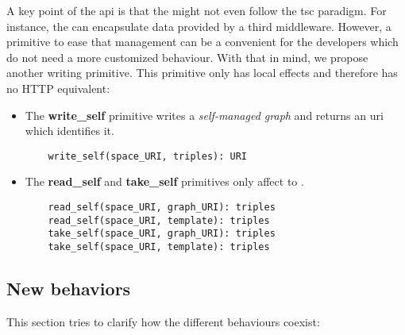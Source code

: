 A key point of the \ac{api} is that the \asteroids{} might not even follow the \ac{tsc} paradigm.
For instance, the \osapi{} can encapsulate data provided by a third middleware.
However, a primitive to ease that management can be a convenient for the developers which do not need a more customized behaviour.
With that in mind, we propose another writing primitive.
This primitive only has local effects and therefore has no HTTP equivalent:
\begin{itemize}
  \item The \textbf{write\_self} primitive writes a \emph{self-managed graph} and returns an \ac{uri} which identifies it.
  
  \begin{lstlisting}
    write_self(space_URI, triples): URI
  \end{lstlisting}
  
  \item The \textbf{read\_self} and \textbf{take\_self} primitives only affect to \selfgraphs{}.
  
  \begin{lstlisting}
    read_self(space_URI, graph_URI): triples
    read_self(space_URI, template): triples
    take_self(space_URI, graph_URI): triples
    take_self(space_URI, template): triples
  \end{lstlisting}
  
\end{itemize}



\subsection{New behaviors}

This section tries to clarify how the different behaviours coexist:

